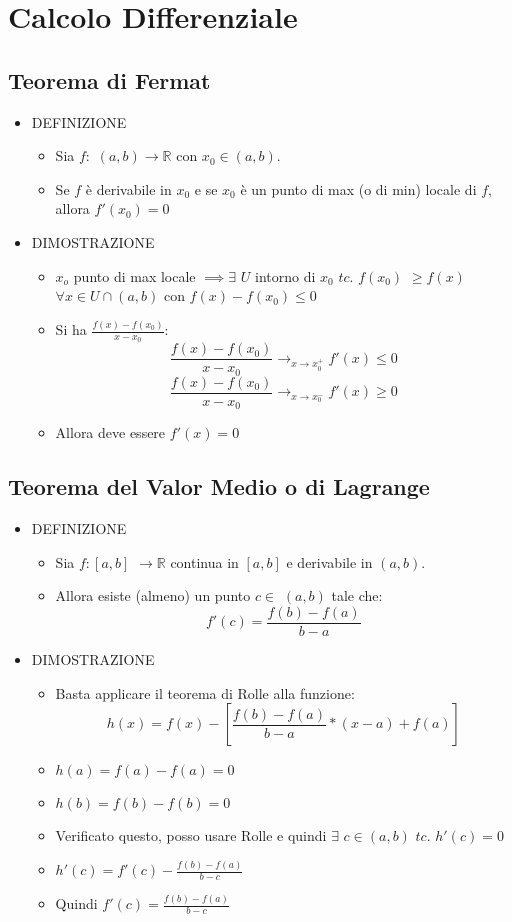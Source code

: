 \documentclass[10pt]{article}
\begin{document}
\section{Calcolo Differenziale}
\subsection{Teorema di Fermat}
\begin{itemize}
\item
DEFINIZIONE
\begin{itemize}
\item 
Sia $f: $ $(a,b) \rightarrow \mathbb{R}$ con $x_0 \in (a,b)$.
\item 
Se $f$ è derivabile in $x_0$ e se $x_0$ è un punto di max (o di min) locale di $f$, allora $f'(x_0) = 0$
\end{itemize} \medskip
\item 
DIMOSTRAZIONE
\begin{itemize}
\item
$x_o$ punto di max locale $\implies \exists$ $U$ intorno di $x_0$ $tc.$ $f(x_0)$ $\geq f(x)$ $\forall x \in U \cap (a,b)$ con $f(x)-f(x_0) \leq 0$ \medskip
\item
Si ha $\displaystyle{\frac{f(x)-f(x_0)}{x-x_0}}$:
$$\frac{f(x)-f(x_0)}{x-x_0} \longrightarrow_{x \to x_0^+} f'(x) \leq 0$$ \medskip
$$\frac{f(x)-f(x_0)}{x-x_0} \longrightarrow_{x \to x_0^-} f'(x) \geq 0$$ \medskip
\item
Allora deve essere $f'(x) = 0$
\end{itemize}
\end{itemize}

\medskip 

\subsection{Teorema del Valor Medio o di Lagrange}
\begin{itemize}
\item
DEFINIZIONE
\begin{itemize}
\item
Sia $f:[a,b]$ $\rightarrow \mathbb{R}$  continua  in  $[a,b]$ e derivabile in $(a,b)$. 
\item
Allora esiste (almeno) un punto $c \in$ $(a,b)$ tale che:
$$f'(c) = \frac{f(b)-f(a)}{b-a}$$
\end{itemize} \medskip
\item 
DIMOSTRAZIONE
\begin{itemize}
\item
Basta applicare il teorema di Rolle alla funzione:
$$h(x) = f(x) - \left[\frac{f(b)-f(a)}{b-a}*(x-a) + f(a)\right]$$\medskip
\item
$h(a) = f(a) - f(a) = 0$
\item
$h(b) = f(b) - f(b)= 0$ \medskip
\item
Verificato questo, posso usare Rolle e quindi $\exists$ $c \in (a,b)$ $tc.$ $h'(c)=0$ \medskip
\item
$h'(c) = f'(c) - \displaystyle{\frac{f(b)-f(a)}{b-c}}$ \medskip
\item
Quindi $f'(c) = \displaystyle{\frac{f(b)-f(a)}{b-c}}$
\end{itemize}
\end{itemize}
\bigskip \medskip \medskip
\end{document}
